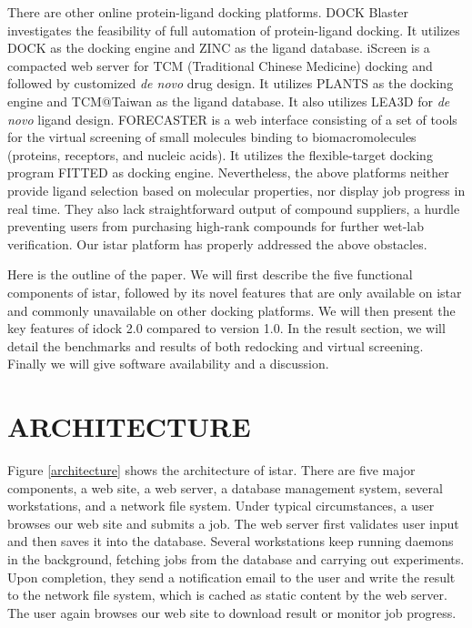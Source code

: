 \documentclass[12pt]{article}
\begin{document}
There are other online protein-ligand docking platforms. DOCK Blaster \citep{557} investigates the feasibility of full automation of protein-ligand docking. It utilizes DOCK \citep{1222} as the docking engine and ZINC \citep{532,1178} as the ligand database. iScreen \citep{899} is a compacted web server for TCM (Traditional Chinese Medicine) docking and followed by customized \textit{de novo} drug design. It utilizes PLANTS \citep{610,607,779} as the docking engine and TCM@Taiwan \citep{528} as the ligand database. It also utilizes LEA3D \citep{1223} for \textit{de novo} ligand design. FORECASTER \citep{1012} is a web interface consisting of a set of tools for the virtual screening of small molecules binding to biomacromolecules (proteins, receptors, and nucleic acids). It utilizes the flexible-target docking program FITTED \citep{602} as docking engine. Nevertheless, the above platforms neither provide ligand selection based on molecular properties, nor display job progress in real time. They also lack straightforward output of compound suppliers, a hurdle preventing users from purchasing high-rank compounds for further wet-lab verification. Our istar platform has properly addressed the above obstacles.

Here is the outline of the paper. We will first describe the five functional components of istar, followed by its novel features that are only available on istar and commonly unavailable on other docking platforms. We will then present the key features of idock 2.0 compared to version 1.0. In the result section, we will detail the benchmarks and results of both redocking and virtual screening. Finally we will give software availability and a discussion.

\section*{\sffamily \Large ARCHITECTURE}

Figure \ref{architecture} shows the architecture of istar. There are five major components, a web site, a web server, a database management system, several workstations, and a network file system. Under typical circumstances, a user browses our web site and submits a job. The web server first validates user input and then saves it into the database. Several workstations keep running daemons in the background, fetching jobs from the database and carrying out experiments. Upon completion, they send a notification email to the user and write the result to the network file system, which is cached as static content by the web server. The user again browses our web site to download result or monitor job progress.
\end{document}

